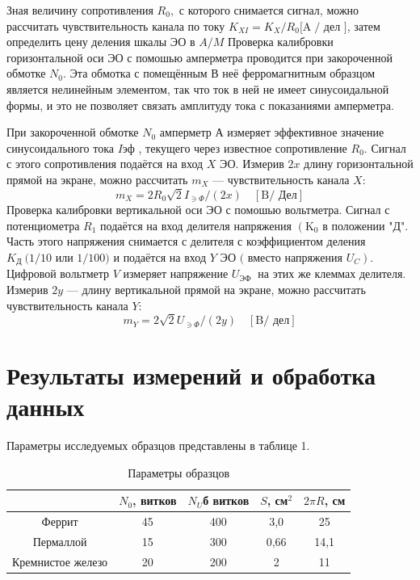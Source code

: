 \documentclass[a4paper]{article}
\theoremstyle{definition}
\theoremstyle{remark}
\begin{document}
\noindent Зная величину сопротивления $R_{0},$ с которого снимается сигнал, можно рассчитать чувствительность канала по току $K_{X I}=K_{X} / R_{0}[\mathrm{A} \;/$ дел $]$, затем определить цену деления шкалы ЭО в $A / M$
Проверка калибровки горизонтальной оси ЭО с помошью амперметра проводится при закороченной обмотке $N_{0} .$ Эта обмотка с помещённым В неё ферромагнитным образцом является нелинейным элементом, так что ток в ней не имеет синусоидальной формы, и это не позволяет связать амплитуду тока с показаниями амперметра. \medskip

\noindent При закороченной обмотке $N_{0}$ амперметр А измеряет эффективное значение синусоидального тока $I$эф , текущего через известное сопротивление $R_{0} .$ Сигнал с этого сопротивления подаётся на вход $X$ ЭО. Измерив $2 x$ длину горизонтальной прямой на экране, можно рассчитать $m_{X}$ --- чувствительность канала $X:$
$$
m_{X}=2 R_{0} \sqrt{2} I_{\ni \Phi} /(2 x) \quad[\mathrm{B} / \text { Дел}]
$$
Проверка калибровки вертикальной оси ЭО с помошью вольтметра. Сигнал с потенциометра $R_{1}$ подаётся на вход делителя напряжения $\left(\mathrm{K}_{0}\right.$ в положении "Д". Часть этого напряжения снимается с делителя с коэффициентом деления $K_{\text {Д }}(1 / 10$ или $1 / 100)$ и подаётся на вход $Y$ ЭО $($ вместо напряжения $\left.U_{C}\right) .$ Цифровой вольтметр $V$ измеряет напряжение $U_{\text {ЭФ }}$ на этих же клеммах делителя. Измерив $2 y$ --- длину вертикальной прямой на экране, можно рассчитать чувствительность канала $Y$:
$$
m_{Y}=2 \sqrt{2} U_{\ni \Phi} /(2 y) \quad[\mathrm{B} / \text { дел}]
$$

\section{Результаты измерений и обработка данных}

Параметры исследуемых образцов представлены в таблице 1.

\begin{table}[h!]
    \centering
    \caption{Параметры образцов}
    \begin{tabular}{|c|c|c|c|c|}
    \hline
                      & $N_0$, витков & $N_U$б витков & $S$, см$^2$ & $2\pi R$, см \\ \hline
    Феррит            & 45            & 400           & 3,0         & 25           \\ \hline
    Пермаллой         & 15            & 300           & 0,66        & 14,1         \\ \hline
    Кремнистое железо & 20            & 200           & 2           & 11           \\ \hline
    \end{tabular}
    \end{table}
\end{document}
